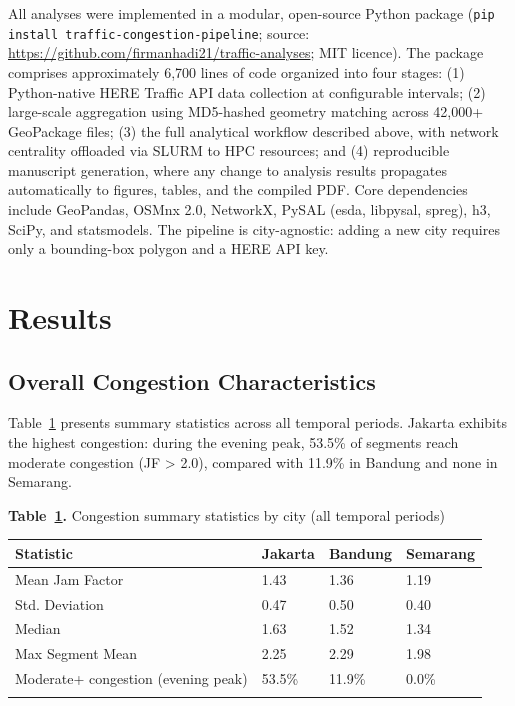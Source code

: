 \documentclass[12pt,a4paper]{article}
\begin{document}
All analyses were implemented in a modular, open-source Python package (\texttt{pip install traffic-congestion-pipeline}; source: \url{https://github.com/firmanhadi21/traffic-analyses}; MIT licence). The package comprises approximately 6,700 lines of code organized into four stages: (1) Python-native HERE Traffic API data collection at configurable intervals; (2) large-scale aggregation using MD5-hashed geometry matching across 42,000+ GeoPackage files; (3) the full analytical workflow described above, with network centrality offloaded via SLURM to HPC resources; and (4) reproducible manuscript generation, where any change to analysis results propagates automatically to figures, tables, and the compiled PDF. Core dependencies include GeoPandas, OSMnx 2.0, NetworkX, PySAL (esda, libpysal, spreg), h3, SciPy, and statsmodels. The pipeline is city-agnostic: adding a new city requires only a bounding-box polygon and a HERE API key.



\section{Results}

\subsection{Overall Congestion Characteristics}

Table~\ref{tab:table5_congestion} presents summary statistics across all temporal periods. Jakarta exhibits the highest congestion: during the evening peak, 53.5\% of segments reach moderate congestion (JF > 2.0), compared with 11.9\% in Bandung and none in Semarang.

\FloatBarrier
\clearpage

\textbf{Table~\ref{tab:table5_congestion}.} Congestion summary statistics by city (all temporal periods)

\begin{longtable}[]{@{}llll@{}}
\toprule\noalign{}
Statistic & Jakarta & Bandung & Semarang \\
\midrule\noalign{}
\endhead
\bottomrule\noalign{}
\endlastfoot
Mean Jam Factor & 1.43 & 1.36 & 1.19 \\
Std. Deviation & 0.47 & 0.50 & 0.40 \\
Median & 1.63 & 1.52 & 1.34 \\
Max Segment Mean & 2.25 & 2.29 & 1.98 \\
Moderate+ congestion (evening peak) & 53.5\% & 11.9\% & 0.0\% \\
\label{tab:table5_congestion}
\end{longtable}
\FloatBarrier
\end{document}
